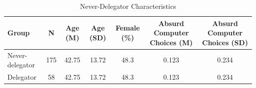 \begin{table}[htbp]
\centering
\caption{Never-Delegator Characteristics}
\begin{tabular}{lcccccc}
\toprule
Group & N & Age (M) & Age (SD) & Female (\%) & Absurd Computer Choices (M) & Absurd Computer Choices (SD) \\
\midrule
Never-delegator & 175 & 42.75 & 13.72 & 48.3 & 0.123 & 0.234 \\
Delegator & 58 & 42.75 & 13.72 & 48.3 & 0.123 & 0.234 \\
\bottomrule
\end{tabular}
\label{tab:never_delegators}
\end{table}